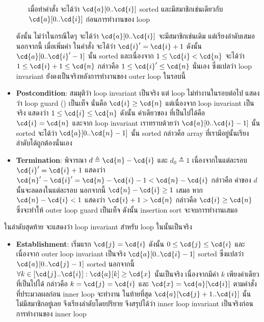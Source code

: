 \begin{example}
\begin{itemize}
\begin{itemize}
\begin{center}
\end{center}
เมื่อทำคำสั่ง  จะได้ว่า $\cd{a}[0..\cd{i}]$ sorted และมีสมาชิกเช่นเดียวกับ $\cd{a}[0..\cd{i}]$ ก่อนการทำงานของ loop
\end{itemize}
ดังนั้น ไม่ว่าในกรณีใดๆ จะได้ว่า $\cd{a}[0..\cd{i}]$ จะมีสมาชิกเช่นเดิม แต่เรียงลำดับเสมอ \enskip นอกจากนี้ เมื่อเพิ่มค่า  ในคำสั่ง  จะได้ว่า $\cd{i}'=\cd{i}+1$ \enskip ดังนั้น $\cd{a}[0..\cd{i}'-1]$ นั้น sorted และเนื่องจาก $1\leq\cd{i}<\cd{n}$ จะได้ว่า $1\leq\cd{i}+1\leq\cd{n}$ กล่าวคือ $1\leq\cd{i}'\leq\cd{n}$ นั่นเอง ซึ่งแปลว่า loop invariant ยังคงเป็นจริงหลังการทำงานของ outer loop ในรอบนี้ \qquad\yea

\item {\bf Postcondition}: สมมุติว่า loop invariant เป็นจริง แต่ loop ไม่ทำงานในรอบต่อไป แสดงว่า loop guard () เป็นเท็จ นั่นคือ $\cd{i}\geq\cd{n}$ \enskip แต่เนื่องจาก loop invariant เป็นจริง แสดงว่า $1\leq\cd{i}\leq\cd{n}$ \enskip ดังนั้น ค่าเดียวของ  ที่เป็นไปได้คือ $\cd{i}=\cd{n}$ \enskip และจาก loop invariant เราทราบด้วยว่า $\cd{a}[0..\cd{i}-1]$ นั้น sorted จะได้ว่า $\cd{a}[0..\cd{n}-1]$ นั้น sorted กล่าวคือ array ที่เรามีอยู่นั้นเรียงลำดับได้ถูกต้องนั่นเอง \qquad\yea

\item {\bf Termination}: พิจารณา $d\triangleq\cd{n}-\cd{i}$ และ $d_0\triangleq 1$ \enskip เนื่องจากในแต่ละรอบ $\cd{i}'=\cd{i}+1$ แสดงว่า $\cd{n}'-\cd{i}'=\cd{n}-\cd{i}-1<\cd{n}-\cd{i}$ กล่าวคือ ค่าของ $d$ นั้นจะลดลงในแต่ละรอบ \enskip นอกจากนี้ $\cd{n}-\cd{i}\geq 1$ เสมอ \enskip หาก $\cd{n}-\cd{i}<1$ แสดงว่า $\cd{i}+1>\cd{n}$ กล่าวคือ $\cd{i}\geq\cd{n}$ ซึ่งจะทำให้ outer loop guard เป็นเท็จ \enskip ดังนั้น insertion sort จะจบการทำงานเสมอ \qquad\yea
\end{itemize}

ในลำดับสุดท้าย จะแสดงว่า loop invariant สำหรับ loop ในนั้นเป็นจริง
\begin{itemize}
\item {\bf Establishment}: เริ่มแรก $\cd{j}=\cd{i}$ ดังนั้น $0\leq\cd{j}\leq\cd{i}$ และเนื่องจาก outer loop invariant เป็นจริง $\cd{a}[0..\cd{i}-1]$ sorted ซึ่งแปลว่า $\cd{a}[0..\cd{j}-1]$ sorted \enskip นอกจากนี้ $\forall k\in[\cd{j}..\cd{i}]: \cd{a}[k]\geq\cd{x}$ นั้นเป็นจริง เนื่องจากมีค่า $k$ เพียงค่าเดียวที่เป็นไปได้ กล่าวคือ $k=\cd{j}=\cd{i}$ และ $\cd{x}=\cd{a}[\cd{i}]$ ตามคำสั่งที่ประมวลผลก่อน inner loop จะทำงาน \enskip ในท้ายที่สุด $\cd{a}[\cd{j}+1..\cd{i}]$ นั้นไม่มีสมาชิกอยู่เลย จึงเรียงลำดับโดยปริยาย \enskip จึงสรุปได้ว่า inner loop invariant เป็นจริงก่อนการทำงานของ inner loop \qquad\yea


\end{itemize}
\end{example}

